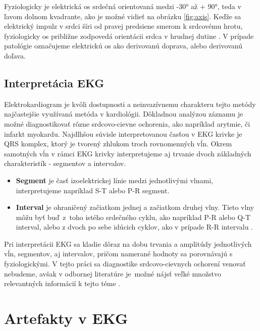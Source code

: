 Fyziologicky je elektrická os srdečná orientovaná medzi -30° až + 90°, teda v ľavom dolnom kvadrante, ako je možné vidieť na obrázku \ref{fig:axis}. Keďže sa elektrický impulz v srdci šíri od pravej predsiene smerom k srdcovému hrotu, fyziologicky os približne zodpovedá orientácii srdca v hrudnej dutine \cite{Bada2010}. V prípade patológie označujeme elektrickú os ako derivovanú doprava, alebo derivovanú doľava.

\subsection{Interpretácia EKG}

Elektrokardiogram je kvôli dostupnosti a neinvazívnemu charakteru tejto metódy najčastejšie využívaná metóda v kardiológii. Dôkladnou analýzou záznamu je možné diagnostikovať rôzne srdcovo-cievne ochorenia, ako napríklad arytmie, či infarkt myokardu. Najdlhšou súvisle interpretovanou časťou v EKG krivke je QRS komplex, ktorý je tvorený zhlukom troch rovnomenných vĺn. Okrem samotných vĺn v rámci EKG krivky interpretujeme aj trvanie dvoch základných charakteristík - segmentov a intervalov.
\begin{itemize}
    \item \textbf{Segment} je časť izoelektrickej línie medzi jednotlivými vlnami, interpretujeme napríklad S-T alebo P-R segment.
    \item \textbf{Interval} je ohraničený začiatkom jednej a začiatkom druhej vlny. Tieto vlny môžu byť buď~z~toho istého srdečného cyklu, ako napríklad P-R alebo Q-T interval, alebo z dvoch po sebe idúcich cyklov, ako v prípade R-R intervalu \cite{Wasilewski2011}.
\end{itemize}

\newpage

Pri interpretácii EKG sa kladie dôraz na dobu trvania a amplitúdy jednotlivých vĺn, segmentov, aj intervalov, pričom namerané hodnoty sa porovnávajú s fyziologickými. V tejto práci sa diagnostike srdcovo-cievnych ochorení venovať nebudeme, avšak v odbornej literatúre je~možné nájsť veľké množstvo relevantných informácií k tejto téme \cite{Wasilewski2011}\cite{Bada2010}\cite{Foster_2007}.


\section{Artefakty v EKG}

